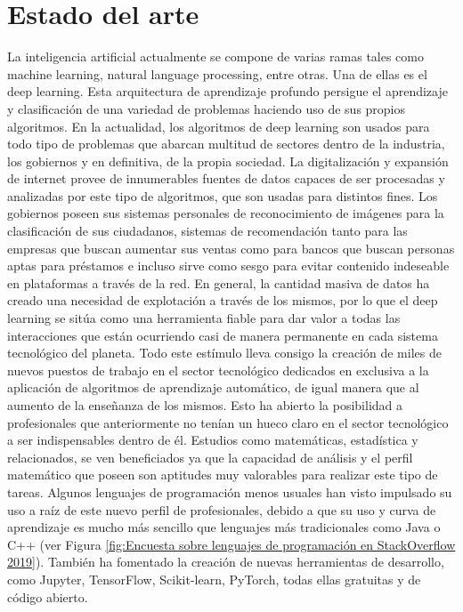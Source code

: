 \section{Estado del arte}\label{sec:estado-del-arte}
La inteligencia artificial actualmente se compone de varias ramas tales como machine learning, natural language processing, entre otras.
Una de ellas es el deep learning.
Esta arquitectura de aprendizaje profundo persigue el aprendizaje y clasificación de una variedad de problemas
haciendo uso de sus propios algoritmos.
En la actualidad, los algoritmos de deep learning son usados para todo tipo de problemas que abarcan multitud de sectores dentro de la industria, los gobiernos y en definitiva, de la propia sociedad.
La digitalización y expansión de internet provee de innumerables fuentes de datos capaces de ser procesadas y analizadas por este tipo de algoritmos, que son usadas para distintos fines.
Los gobiernos poseen sus sistemas personales de reconocimiento de imágenes para la clasificación de sus ciudadanos, sistemas de recomendación tanto para las empresas que buscan aumentar sus ventas como para bancos que buscan personas aptas para préstamos e incluso sirve como sesgo para evitar contenido indeseable en plataformas a través de la red.
En general, la cantidad masiva de datos ha creado una necesidad de explotación a
través de los mismos, por lo que el deep learning se sitúa como una herramienta fiable para dar valor a todas las interacciones que están ocurriendo casi de manera permanente
en cada sistema tecnológico del planeta.
Todo este estímulo lleva consigo la creación de miles de nuevos puestos de trabajo en el sector tecnológico dedicados en exclusiva a la aplicación de algoritmos de aprendizaje automático, de igual manera que al aumento de la enseñanza de los mismos.
Esto ha abierto la posibilidad a profesionales que anteriormente no tenían un hueco claro en el sector tecnológico a ser indispensables dentro de él.
Estudios como matemáticas, estadística y relacionados,
se ven beneficiados ya que la capacidad de análisis y el perfil matemático que poseen son aptitudes muy valorables para realizar este tipo de tareas.
Algunos lenguajes de programación menos usuales han visto impulsado su uso a raíz de este nuevo perfil de profesionales, debido a que su uso y curva de aprendizaje es mucho más sencillo que lenguajes más tradicionales como Java o C++ (ver Figura \ref{fig:Encuesta sobre lenguajes de programación en StackOverflow 2019}).
También ha fomentado la creación de nuevas herramientas de desarrollo, como Jupyter, TensorFlow, Scikit-learn, PyTorch, todas ellas gratuitas y de código abierto.

